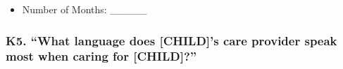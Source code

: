 \documentclass[
  12pt,
]{book}
\providecommand{\tightlist}{%
  \setlength{\itemsep}{0pt}\setlength{\parskip}{0pt}}
\begin{document}
\begin{itemize}
\tightlist
\item
  Number of Months: \_\_\_\_\_
\end{itemize}

\hypertarget{k5.-what-language-does-childs-care-provider-speak-most-when-caring-for-child}{%
\subsubsection*{K5. ``What language does {[}CHILD{]}'s care provider speak most when caring for {[}CHILD{]}?''}\label{k5.-what-language-does-childs-care-provider-speak-most-when-caring-for-child}}

  
\end{document}
